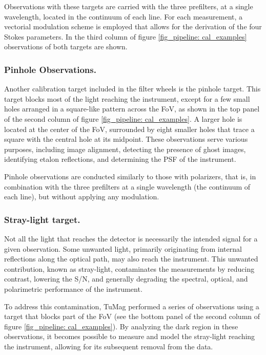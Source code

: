 Observations with these targets are carried with the three prefilters, at a single wavelength, located in the continuum of each line. For each measurement, a vectorial modulation scheme is employed that allows for the derivation of the four Stokes parameters. In the third column of figure \ref{fig_pipeline: cal_examples} observations of both targets are shown. 

\subsubsection{Pinhole Observations.}

Another calibration target included in the filter wheels is the pinhole target. This target blocks most of the light reaching the instrument, except for a few small holes arranged in a square-like pattern across the FoV, as shown in the top panel of the second column of figure \ref{fig_pipeline: cal_examples}. A larger hole is located at the center of the FoV, surrounded by eight smaller holes that trace a square with the central hole at its midpoint. These observations serve various purposes, including image alignment, detecting the presence of ghost images, identifying etalon reflections, and determining the PSF of the instrument.

Pinhole observations are conducted similarly to those with polarizers, that is, in combination with the three prefilters at a single wavelength (the continuum of each line), but without applying any modulation.

\subsubsection{Stray-light target.}

Not all the light that reaches the detector is necessarily the intended signal for a given observation. Some unwanted light, primarily originating from internal reflections along the optical path, may also reach the instrument. This unwanted contribution, known as stray-light, contaminates the measurements by reducing contrast, lowering the S/N, and generally degrading the spectral, optical, and polarimetric performance of the instrument.

To address this contamination, TuMag performed a series of observations using a target that blocks part of the FoV (see the bottom panel of the second column of figure \ref{fig_pipeline: cal_examples}). By analyzing the dark region in these observations, it becomes possible to measure and model the stray-light reaching the instrument, allowing for its subsequent removal from the data.

